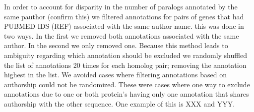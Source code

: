 In order to account for disparity in the number of paralogs annotated by the same pauthor (confirm this) we filtered annotations for pairs of genes that had PUBMED IDS (REF) associated with the same author name.  this was done in two ways.  In the first we removed both annotations associated with the same author. In the second we only removed one.  Because this method leads to ambiguity regarding which annotation should be excluded we randomly shuffled the list of annotations 20 times for each homolog pair; removing the annotation highest in the list.  We avoided cases where filtering annotations based on authorship could not be randomized.  These were cases where one way to exclude annotations due to one or both protein's having only one annotation that shares authorship with the other sequence.  One example of this is XXX and YYY.


